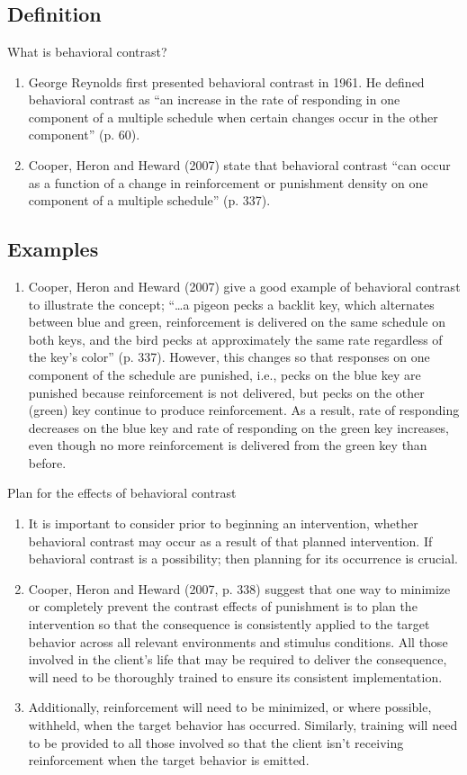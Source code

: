 \section{\foureSeven{}}
\subsection{Definition}
What is behavioral contrast?
\begin{enumerate}
\item George Reynolds first presented behavioral contrast in 1961. He defined behavioral contrast as ``an increase in the rate of responding in one component of a multiple schedule when certain changes occur in the other component'' (p. 60). 
\item Cooper, Heron and Heward (2007) state that behavioral contrast ``can occur as a function of a change in reinforcement or punishment density on one component of a multiple schedule'' (p. 337).
\end{enumerate}
%
\subsection{Examples}
\begin{enumerate}
\item Cooper, Heron and Heward (2007) give a good example of behavioral contrast to illustrate the concept; ``…a pigeon pecks a backlit key, which alternates between blue and green, reinforcement is delivered on the same schedule on both keys, and the bird pecks at approximately the same rate regardless of the key's color'' (p. 337). However, this changes so that responses on one component of the schedule are punished, i.e., pecks on the blue key are punished because reinforcement is not delivered, but pecks on the other (green) key continue to produce reinforcement. As a result, rate of responding decreases on the blue key and rate of responding on the green key increases, even though no more reinforcement is delivered from the green key than before.
\end{enumerate}
%
Plan for the effects of behavioral contrast
\begin{enumerate}
\item It is important to consider prior to beginning an intervention, whether behavioral contrast may occur as a result of that planned intervention. If behavioral contrast is a possibility; then planning for its occurrence is crucial.
\item Cooper, Heron and Heward (2007, p. 338) suggest that one way to minimize or completely prevent the contrast effects of punishment is to plan the intervention so that the consequence is consistently applied to the target behavior across all relevant environments and stimulus conditions. All those involved in the client's life that may be required to deliver the consequence, will need to be thoroughly trained to ensure its consistent implementation.
\item Additionally, reinforcement will need to be minimized, or where possible, withheld, when the target behavior has occurred. Similarly, training will need to be provided to all those involved so that the client isn't receiving reinforcement when the target behavior is emitted.
\end{enumerate}
%
